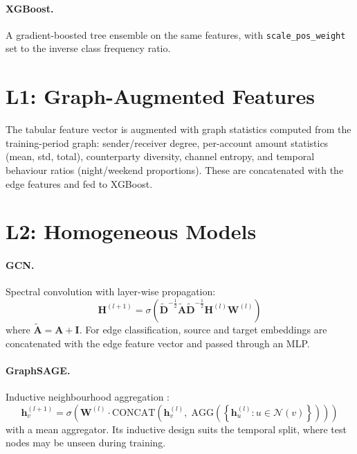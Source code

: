 \paragraph{XGBoost.}
A gradient-boosted tree ensemble on the same features, with \texttt{scale\_pos\_weight} set to the inverse class frequency ratio.

\section{L1: Graph-Augmented Features}
\label{sec:l1}

The tabular feature vector is augmented with graph statistics computed from the training-period graph: sender/receiver degree, per-account amount statistics (mean, std, total), counterparty diversity, channel entropy, and temporal behaviour ratios (night/weekend proportions). These are concatenated with the edge features and fed to XGBoost.

\section{L2: Homogeneous Models}
\label{sec:l2}

\paragraph{GCN.}
Spectral convolution \citep{kipf2017gcn} with layer-wise propagation:
\begin{equation}
  \mathbf{H}^{(l+1)} = \sigma\!\left(\tilde{\mathbf{D}}^{-\frac{1}{2}} \tilde{\mathbf{A}} \tilde{\mathbf{D}}^{-\frac{1}{2}} \mathbf{H}^{(l)} \mathbf{W}^{(l)}\right)
\end{equation}
where $\tilde{\mathbf{A}} = \mathbf{A} + \mathbf{I}$. For edge classification, source and target embeddings are concatenated with the edge feature vector and passed through an MLP.

\paragraph{GraphSAGE.}
Inductive neighbourhood aggregation \citep{hamilton2017sage}:
\begin{equation}
  \mathbf{h}_v^{(l+1)} = \sigma\!\left(\mathbf{W}^{(l)} \cdot \mathrm{CONCAT}\!\left(\mathbf{h}_v^{(l)},\; \mathrm{AGG}\!\left(\left\{\mathbf{h}_u^{(l)} : u \in \mathcal{N}(v)\right\}\right)\right)\right)
\end{equation}
with a mean aggregator. Its inductive design suits the temporal split, where test nodes may be unseen during training.

